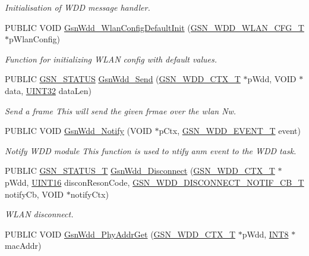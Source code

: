 \begin{DoxyCompactItemize}
\begin{DoxyCompactList}\small\item\em Initialisation of WDD message handler. \end{DoxyCompactList}\item 
PUBLIC VOID \hyperlink{a00677_gab31391ef7af2845ebae8b20e56912e90}{GsnWdd\_\-WlanConfigDefaultInit} (\hyperlink{a00302}{GSN\_\-WDD\_\-WLAN\_\-CFG\_\-T} $\ast$pWlanConfig)
\begin{DoxyCompactList}\small\item\em Function for initializing WLAN config with default values. \end{DoxyCompactList}\item 
PUBLIC \hyperlink{a00660_gada5951904ac6110b1fa95e51a9ddc217}{GSN\_\-STATUS} \hyperlink{a00677_ga2c932ee5c2900c450040a2af92048cd0}{GsnWdd\_\-Send} (\hyperlink{a00108}{GSN\_\-WDD\_\-CTX\_\-T} $\ast$pWdd, VOID $\ast$data, \hyperlink{a00660_gae1e6edbbc26d6fbc71a90190d0266018}{UINT32} dataLen)
\begin{DoxyCompactList}\small\item\em Send a frame This will send the given frmae over the wlan Nw. \end{DoxyCompactList}\item 
PUBLIC VOID \hyperlink{a00677_ga3b57a234af35c0dc77fa3760a2f3f07f}{GsnWdd\_\-Notify} (VOID $\ast$pCtx, \hyperlink{a00677_ga82734573aab1decd3ffd115af490f892}{GSN\_\-WDD\_\-EVENT\_\-T} event)
\begin{DoxyCompactList}\small\item\em Notify WDD module This function is used to ntify anm event to the WDD task. \end{DoxyCompactList}\item 
PUBLIC \hyperlink{a00659_gae36517c0f5872426a7034c9551eb96ac}{GSN\_\-STATUS\_\-T} \hyperlink{a00677_ga357552985ff387064e0c3feaa21b5808}{GsnWdd\_\-Disconnect} (\hyperlink{a00108}{GSN\_\-WDD\_\-CTX\_\-T} $\ast$pWdd, \hyperlink{a00660_ga09f1a1fb2293e33483cc8d44aefb1eb1}{UINT16} disconResonCode, \hyperlink{a00603_ac5fbb773daa449d33e065683260e253d}{GSN\_\-WDD\_\-DISCONNECT\_\-NOTIF\_\-CB\_\-T} notifyCb, VOID $\ast$notifyCtx)
\begin{DoxyCompactList}\small\item\em WLAN disconnect. \end{DoxyCompactList}\item 
PUBLIC VOID \hyperlink{a00677_ga2de8f5753f24ef1ae1aa69d8afcbf763}{GsnWdd\_\-PhyAddrGet} (\hyperlink{a00108}{GSN\_\-WDD\_\-CTX\_\-T} $\ast$pWdd, \hyperlink{a00660_ga307b8734c020247f6bac4fcde0dcfbb9}{INT8} $\ast$macAddr)

\end{DoxyCompactItemize}
